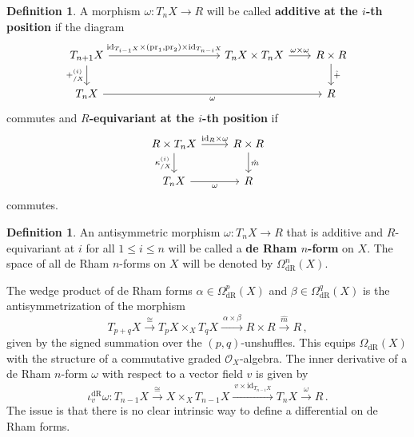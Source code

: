 \documentclass[12pt,reqno, a4paper]{amsart}
\numberwithin{equation}{section}
\theoremstyle{plain}
\theoremstyle{definition}
\newtheorem{Definition}[Theorem]{Definition}
\theoremstyle{remark}
\newcommand{\calO}{\mathcal{O}}
\newcommand{\id}{\mathrm{id}}
\newcommand{\pr}{\mathrm{pr}}
\newcommand{\Rmult}{\hat{m}}
\newcommand{\Radd}{\hat{+}}
\begin{document}
\begin{Definition}
\label{def:DeRhamFormAti}
A morphism $\omega\colon T_n X \to R$ will be called \textbf{additive at the $i$-th position} if the diagram
\begin{equation}
\label{diag:DeRhamForm1}
\begin{tikzcd}[column sep=2em]
T_{n+1}X
\ar[d, "+^{(i)}_{/X}"']
\ar[r, "{ \id_{T_{i-1}X} \times (\pr_1, \pr_2) \times \id_{T_{n-i}X} }"]
&[8em]
T_n X \times T_n X
\ar[r, "\omega \times \omega"]
&
R \times R
\ar[d, "\Radd"]
\\
T_n X
\ar[rr, "\omega"']
&&
R
\end{tikzcd}
\end{equation}
commutes and \textbf{$R$-equivariant at the $i$-th position} if
\begin{equation}
\label{diag:DeRhamForm2}
\begin{tikzcd}
R \times T_n X
\ar[d, "\kappa^{(i)}_{/X}"']
\ar[r, "{\id_R \times \omega}"]
&
R \times R
\ar[d, "\Rmult"]
\\
T_n X
\ar[r, "\omega"']
&
R
\end{tikzcd}
\end{equation}
commutes.
\end{Definition}

\begin{Definition}
\label{def:DeRhamForms}
An antisymmetric morphism $\omega\colon T_n X \to R$ that is additive and $R$-equivariant at $i$ for all $1 \leq i \leq n$ will be called a \textbf{de Rham $n$-form} on $X$. The space of all de Rham $n$-forms on $X$ will be denoted by $\Omega^n_\mathrm{dR}(X)$.
\end{Definition}

The wedge product of de Rham forms $\alpha \in \Omega^p_\mathrm{dR}(X)$ and $\beta \in \Omega^q_\mathrm{dR}(X)$ is the antisymmetrization of the morphism
\begin{equation*}
  T_{p+q} X \xrightarrow{~\cong~}
  T_p X \times_X T_q X
  \xrightarrow{~\alpha \times \beta~}
  R \times R \xrightarrow{~\Rmult~}
  R
  \,,
\end{equation*}
given by the signed summation over the $(p,q)$-unshuffles. This equips $\Omega_\mathrm{dR}(X)$ with the structure of a commutative graded $\calO_X$-algebra. The inner derivative of a de Rham $n$-form $\omega$ with respect to a vector field $v$ is given by
\begin{equation*}
  \iota_v^\mathrm{dR} \omega:
  T_{n-1} X \xrightarrow{~\cong~}
  X \times_X T_{n-1} X \xrightarrow{~v \times \id_{T_{n-1}X}~}
  T_n X \xrightarrow{~\omega~}
  R
  \,.
\end{equation*}
The issue is that there is no clear intrinsic way to define a differential on de Rham forms.
\end{document}
